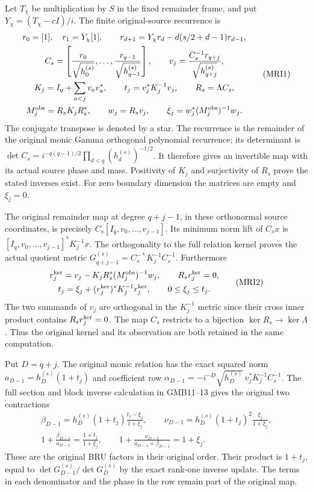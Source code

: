 \documentclass[11pt,a4paper]{article}
\begin{document}
Let $T_\chi$ be multiplication by $S$ in the fixed remainder
frame, and put $Y_\chi=(T_\chi-cI)/i$. The finite original-source
recurrence is
\[
\begin{gathered}
 r_0=[1],\quad r_1=Y_\chi[1],\qquad
 r_{d+1}=Y_\chi r_d-d(s/2+d-1)r_{d-1},\\
 C_s=\left[\frac{r_0}{\sqrt{h_0^{(s)}}},\ldots,
          \frac{r_{q-1}}{\sqrt{h_{q-1}^{(s)}}}\right],\qquad
 v_j=\frac{C_s^{-1}r_{q+j}}{\sqrt{h_{q+j}^{(s)}}},\\
 K_j=I_q+\sum_{a<j}v_av_a^*,\qquad
 t_j=v_j^*K_j^{-1}v_j,\qquad R_s=\Lambda C_s,\\
 M_j^{\rm obs}=R_sK_jR_s^*,\qquad
 w_j=R_sv_j,\qquad
 \xi_j=w_j^*(M_j^{\rm obs})^{-1}w_j.
\end{gathered}\tag{MRI1}
\]
The conjugate transpose is denoted by a star. The recurrence is
the remainder of the original monic Gamma orthogonal polynomial
recurrence; its determinant is
$\det C_s=i^{-q(q-1)/2}\prod_{d<q}(h_d^{(s)})^{-1/2}$.
It therefore gives an invertible map with its actual source
phase and mass. Positivity of $K_j$ and surjectivity of $R_s$
prove the stated inverses exist. For zero boundary dimension
the matrices are empty and $\xi_j=0$.

The original remainder map at degree $q+j-1$, in these orthonormal
source coordinates, is precisely
$C_s[I_q,v_0,\ldots,v_{j-1}]$. Its minimum norm lift of $C_sx$
is $[I_q,v_0,\ldots,v_{j-1}]^*K_j^{-1}x$. The orthogonality to
the full relation kernel proves the actual quotient metric
$G_{q+j-1}^{(s)}=C_s^{-*}K_j^{-1}C_s^{-1}$.
Furthermore
\[
\begin{gathered}
 r_j^{\rm ker}=v_j-K_jR_s^*(M_j^{\rm obs})^{-1}w_j,
 \qquad R_sr_j^{\rm ker}=0,\\
 t_j=\xi_j+(r_j^{\rm ker})^*K_j^{-1}r_j^{\rm ker},
 \qquad0\le\xi_j\le t_j.
\end{gathered}\tag{MRI2}
\]
The two summands of $v_j$ are orthogonal in the $K_j^{-1}$
metric since their cross inner product contains $R_sr_j^{\rm ker}=0$.
The map $C_s$ restricts to a bijection
$\ker R_s\to\ker\Lambda$. Thus the original kernel and its
observation are both retained in the same computation.

Put $D=q+j$. The original monic relation has the exact squared
norm $a_{D-1}=h_D^{(s)}(1+t_j)$ and coefficient row
$\alpha_{D-1}=-i^{-D}\sqrt{h_D^{(s)}}\,
v_j^*K_j^{-1}C_s^{-1}$. The full section and block inverse
calculation in GMB11--13 gives the original two contractions
\[
\begin{gathered}
 \beta_{D-1}=h_D^{(s)}(1+t_j)\frac{t_j-\xi_j}{1+\xi_j},
 \qquad
 \nu_{D-1}=h_D^{(s)}(1+t_j)^2\frac{\xi_j}{1+\xi_j},\\
 1+\frac{\beta_{D-1}}{a_{D-1}}
          =\frac{1+t_j}{1+\xi_j},\qquad
 1+\frac{\nu_{D-1}}{a_{D-1}+\beta_{D-1}}=1+\xi_j.
\end{gathered}\tag{MRI3}
\]
These are the original BRU factors in their original order. Their
product is $1+t_j$, equal to
$\det G_{D-1}^{(s)}/\det G_D^{(s)}$ by the exact rank-one
inverse update. The terms in each denominator and the phase in
the row remain part of the original map.
\end{document}
